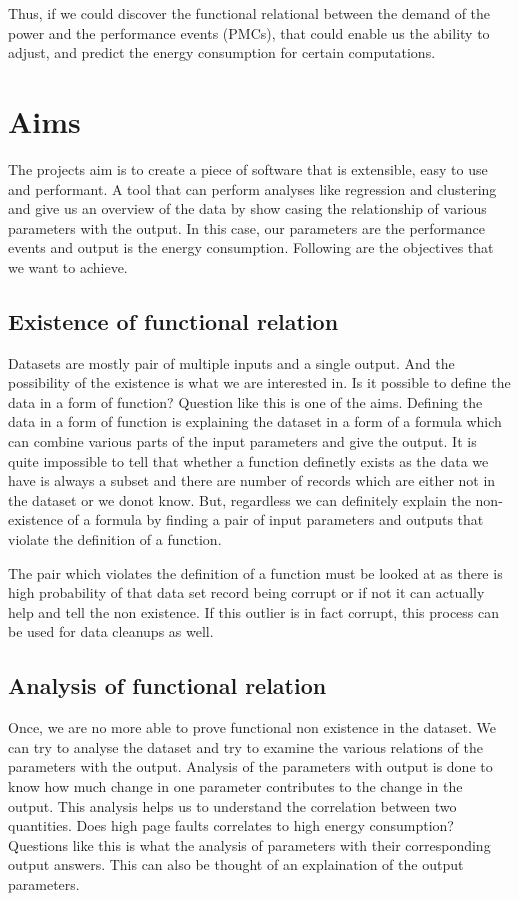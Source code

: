 Thus, if we could discover the functional relational between the demand of the power and the performance events (PMCs), that could enable us the ability to adjust, and predict the energy consumption for certain computations.

\section{Aims}

The projects aim is to create a piece of software that is extensible, easy to use and performant. A tool that can perform analyses like regression and clustering and give us an overview of the data by show casing the relationship of various parameters with the output. In this case, our parameters are the performance events and output is the energy consumption. Following are the objectives that we want to achieve.

\subsection{Existence of functional relation}

Datasets are mostly pair of multiple inputs and a single output. And the possibility of the existence is what we are interested in. Is it possible to define the data in a form of function? Question like this is one of the aims. Defining the data in a form of function is explaining the dataset in a form of a formula which can combine various parts of the input parameters and give the output. It is quite impossible to tell that whether a function definetly exists as the data we have is always a subset and there are number of records which are either not in the dataset or we donot know. But, regardless we can definitely explain the non-existence of a formula by finding a pair of input parameters and outputs that violate the definition of a function.

The pair which violates the definition of a function must be looked at as there is high probability of that data set record being corrupt or if not it can actually help and tell the non existence. If this outlier is in fact corrupt, this process can be used for data cleanups as well.

\subsection{Analysis of functional relation}

Once, we are no more able to prove functional non existence in the dataset. We can try to analyse the dataset and try to examine the various relations of the parameters with the output. Analysis of the parameters with output is done to know how much change in one parameter contributes to the change in the output. This analysis helps us to understand the correlation between two quantities. Does high page faults correlates to high energy consumption? Questions like this is what the analysis of parameters with their corresponding output answers. This can also be thought of an explaination of the output parameters.

